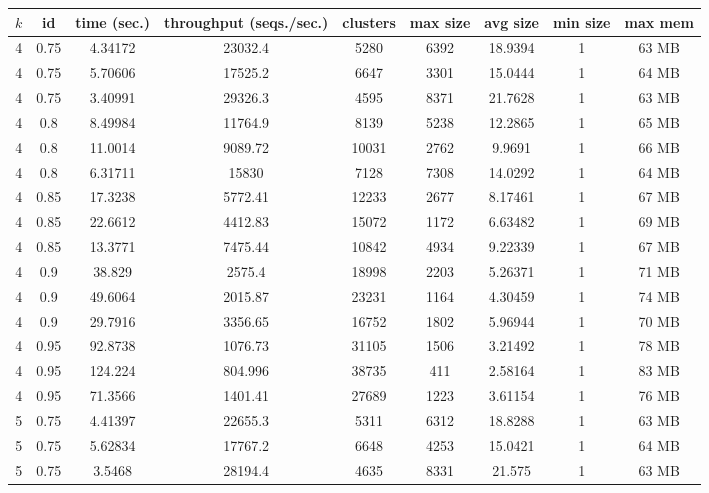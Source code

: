 \begingroup
\setlength{\LTleft}{-20cm plus -1fill}
\setlength{\LTright}{\LTleft}
\begin{longtable}{c|c|c|c|c|c|c|c|c}
  $k$ & id & time (sec.) & throughput (seqs./sec.) & clusters & max size & avg size & min size & max mem \\
  \hline \hline
  4   &  0.75  &  4.34172  &  23032.4  &  5280   &  6392  &  18.9394  &  1  &  63  MB \\
  4   &  0.75  &  5.70606  &  17525.2  &  6647   &  3301  &  15.0444  &  1  &  64  MB \\
  4   &  0.75  &  3.40991  &  29326.3  &  4595   &  8371  &  21.7628  &  1  &  63  MB \\
  \hline
  4   &  0.8   &  8.49984  &  11764.9  &  8139   &  5238  &  12.2865  &  1  &  65  MB \\
  4   &  0.8   &  11.0014  &  9089.72  &  10031  &  2762  &  9.9691   &  1  &  66  MB \\
  4   &  0.8   &  6.31711  &  15830    &  7128   &  7308  &  14.0292  &  1  &  64  MB \\
  \hline
  4   &  0.85  &  17.3238  &  5772.41  &  12233  &  2677  &  8.17461  &  1  &  67  MB \\
  4   &  0.85  &  22.6612  &  4412.83  &  15072  &  1172  &  6.63482  &  1  &  69  MB \\
  4   &  0.85  &  13.3771  &  7475.44  &  10842  &  4934  &  9.22339  &  1  &  67  MB \\
  \hline
  4   &  0.9   &  38.829   &  2575.4   &  18998  &  2203  &  5.26371  &  1  &  71  MB \\
  4   &  0.9   &  49.6064  &  2015.87  &  23231  &  1164  &  4.30459  &  1  &  74  MB \\
  4   &  0.9   &  29.7916  &  3356.65  &  16752  &  1802  &  5.96944  &  1  &  70  MB \\
  \hline
  4   &  0.95  &  92.8738  &  1076.73  &  31105  &  1506  &  3.21492  &  1  &  78  MB \\
  4   &  0.95  &  124.224  &  804.996  &  38735  &  411   &  2.58164  &  1  &  83  MB \\
  4   &  0.95  &  71.3566  &  1401.41  &  27689  &  1223  &  3.61154  &  1  &  76  MB \\
  \hline
  5   &  0.75  &  4.41397  &  22655.3  &  5311   &  6312  &  18.8288  &  1  &  63  MB \\
  5   &  0.75  &  5.62834  &  17767.2  &  6648   &  4253  &  15.0421  &  1  &  64  MB \\
  5   &  0.75  &  3.5468   &  28194.4  &  4635   &  8331  &  21.575   &  1  &  63  MB \\

\end{longtable}
